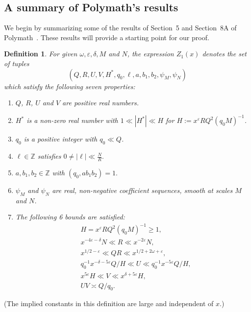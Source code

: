 \documentclass{amsart}
\newtheorem{defn}{Definition}
\numberwithin{equation}{section}
\begin{document}
\subsection{A summary of Polymath's results}



We begin by summarizing some of the results of Section~5 and Section~8A of Polymath~\cite{Polymath:2014:EDZ}. These results will provide a starting point for our proof. 

\begin{defn}\label{def:Z1}
For  given $\omega,\varepsilon, \delta, M$ and $N$,  the expression $Z_1(x)$ denotes the set of tuples $$(Q,R,U,V,H^*,q_0,\ell,a,b_1,b_2,\psi_M,\psi_N)$$ which satisfy the following seven properties: 
\begin{enumerate}[{\rm (i)}]
\item $Q$, $R$, $U$ and $V$ are positive real numbers.
\item $H^*$ is a non-zero real number with  $1 \ll |H^*| \ll H$ for  $H := x^\varepsilon RQ^2(q_0 M)^{-1}$.
\item $q_0$ is a positive integer with $q_0 \ll Q$.
\item  $\ell \in \mathbb{Z}$ satisfies $0 \neq |\ell| \ll \frac{N}{R}.$
\item $a, b_1, b_2 \in \mathbb{Z}$ with  $(q_0,ab_1b_2)=1.$
\item $\psi_M$ and $\psi_N$ are real, non-negative coefficient sequences, smooth at scales $M$ and $N$.
\item  The following 6 bounds are satisfied:
\begin{align} 
&H = x^\varepsilon RQ^2(q_0 M)^{-1}\geq 1,\\
&x^{-4\varepsilon-\delta}N \ll R \ll x^{-2\varepsilon}N, \label{equ:rangeQ}\\
&x^{1/2-\varepsilon} \ll QR \ll x^{1/2+2\omega+\varepsilon}, \label{equ:rangeR}\\
\label{def:UV1}
&q_0^{-1} x^{-\delta-5\varepsilon}Q/H \ll U \ll q_0^{-1}x^{-5\varepsilon} Q/H,\\ \label{def:UV2}
&x^{5\varepsilon}H \ll V \ll x^{\delta+5\varepsilon}H,\\ \label{def:UV3}
&UV \asymp Q/q_0.
\end{align} 
\end{enumerate}
\end{defn}
(The implied constants in this definition are   large and independent of $x$.)
\end{document}
